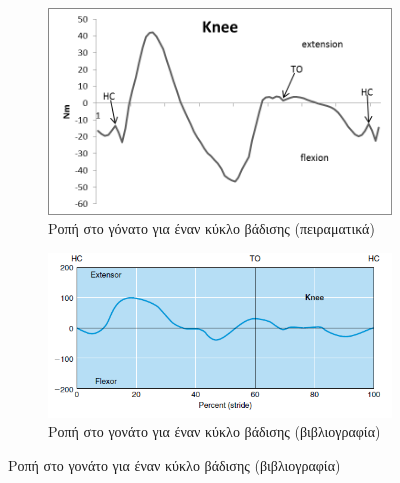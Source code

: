 \begin{figure}[H]
    \centering
    \begin{subfigure}[t]{.48\textwidth}
        \includegraphics[width=\textwidth, keepaspectratio]{fig/id-knee.png}
        \caption{Ροπή στο γόνατο για έναν κύκλο βάδισης (πειραματικά)}
        \label{fig:knee-moment}
    \end{subfigure}
    \begin{subfigure}[t]{.48\textwidth}
        \includegraphics[width=\textwidth, keepaspectratio]{fig/id-knee-ref.png}
        \caption{Ροπή στο γονάτο για έναν κύκλο βάδισης (βιβλιογραφία)}
        \label{fig:knee-moment-ref}
    \end{subfigure}


\end{figure}
